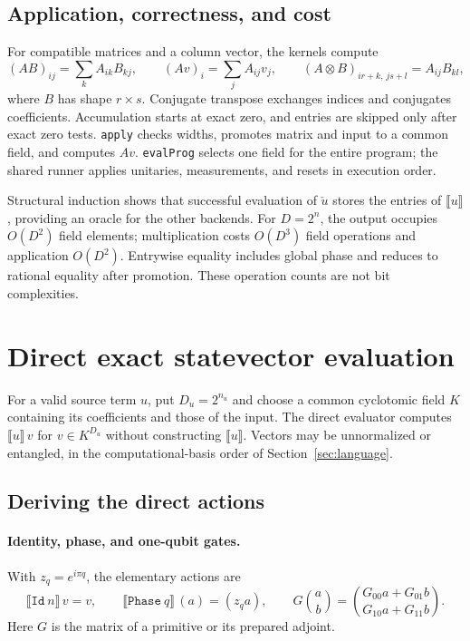 \documentclass[11pt,a4paper]{article}
\newcommand{\sem}[1]{\llbracket #1\rrbracket}
\newcommand{\code}[1]{\texttt{#1}}
\begin{document}
\subsection{Application, correctness, and cost}
For compatible matrices and a column vector, the kernels compute
\[
(AB)_{ij}=\sum_k A_{ik}B_{kj},\qquad
(Av)_i=\sum_j A_{ij}v_j,\qquad
(A\otimes B)_{ir+k,\,js+l}=A_{ij}B_{kl},
\]
where $B$ has shape $r\times s$. Conjugate transpose exchanges indices
and conjugates coefficients. Accumulation starts at exact zero, and
entries are skipped only after exact zero tests. \code{apply} checks
widths, promotes matrix and input to a common field, and computes $Av$.
\code{evalProg} selects one field for the entire program; the shared runner
applies unitaries, measurements, and resets in execution order.

Structural induction shows that successful evaluation of $\check u$ stores
the entries of $\sem u$, providing an oracle for the other backends.
For $D=2^n$, the output occupies $O(D^2)$ field elements;
multiplication costs $O(D^3)$ field operations and application $O(D^2)$.
Entrywise equality includes global phase and reduces to rational equality
after promotion. These operation counts are not bit complexities.

\section{Direct exact statevector evaluation}
\label{sec:sv}
For a valid source term $u$, put $D_u=2^{n_u}$ and choose a common cyclotomic
field $K$ containing its coefficients and those of the input.
The direct evaluator computes $\sem u\,v$ for $v\in K^{D_u}$ without
constructing $\sem u$. Vectors may be unnormalized or entangled, in the
computational-basis order of Section~\ref{sec:language}.

\subsection{Deriving the direct actions}
\paragraph{Identity, phase, and one-qubit gates.}
With $z_q=e^{i\pi q}$, the elementary actions are
\[
\sem{\code{Id}\ n}\,v=v,\qquad
\sem{\code{Phase}\ q}\,(a)=(z_q a),\qquad
G\binom{a}{b}=
\binom{G_{00}a+G_{01}b}{G_{10}a+G_{11}b}.
\]
Here $G$ is the matrix of a primitive or its prepared adjoint.
\end{document}
